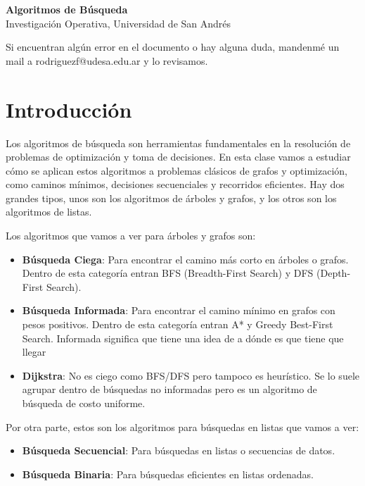 \documentclass[12pt]{article}
\begin{document}
\begin{center}
  {\LARGE \textbf{Algoritmos de Búsqueda}}\\[0.5em]
  {Investigación Operativa, Universidad de San Andrés}
\end{center}

Si encuentran algún error en el documento o hay alguna duda, mandenmé un mail a rodriguezf@udesa.edu.ar y lo revisamos.

\section{Introducción}
Los algoritmos de búsqueda son herramientas fundamentales en la resolución de problemas de optimización y toma de decisiones. En esta clase vamos a estudiar cómo se aplican estos algoritmos a problemas clásicos de grafos y optimización, como caminos mínimos, decisiones secuenciales y recorridos eficientes. Hay dos grandes tipos, unos son los algoritmos de árboles y grafos, y los otros son los algoritmos de listas.

\vspace{0.5em}

Los algoritmos que vamos a ver para árboles y grafos son:
\begin{itemize}
    \item \textbf{Búsqueda Ciega}: Para encontrar el camino más corto en árboles o grafos. Dentro de esta categoría entran BFS (Breadth-First Search) y DFS (Depth-First Search).
    \item \textbf{Búsqueda Informada}: Para encontrar el camino mínimo en grafos con pesos positivos. Dentro de esta categoría entran A* y Greedy Best-First Search. Informada significa que tiene una idea de a dónde es que tiene que llegar
    \item \textbf{Dijkstra}: No es ciego como BFS/DFS pero tampoco es heurístico. Se lo suele agrupar dentro de búsquedas no informadas pero es un algoritmo de búsqueda de costo uniforme.
\end{itemize}

Por otra parte, estos son los algoritmos para búsquedas en listas que vamos a ver:
\begin{itemize}
    \item \textbf{Búsqueda Secuencial}: Para búsquedas en listas o secuencias de datos.
    \item \textbf{Búsqueda Binaria}: Para búsquedas eficientes en listas ordenadas.
\end{itemize}
\end{document}
